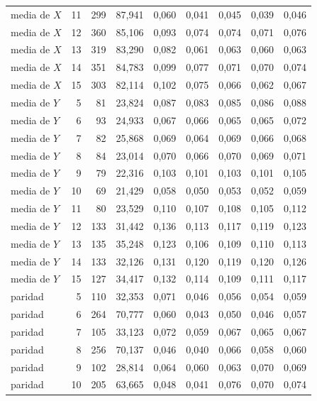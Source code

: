 \begin{table}[htbp]
{\begin{tabular}{@{}lrrrrrrrr@{}}
        media de $X$ & 11 & 299 & 87,941 & 0,060 & 0,041 & 0,045 & 0,039 & 0,046 \\
        media de $X$ & 12 & 360 & 85,106 & 0,093 & 0,074 & 0,074 & 0,071 & 0,076 \\
        media de $X$ & 13 & 319 & 83,290 & 0,082 & 0,061 & 0,063 & 0,060 & 0,063 \\
        media de $X$ & 14 & 351 & 84,783 & 0,099 & 0,077 & 0,071 & 0,070 & 0,074 \\
        media de $X$ & 15 & 303 & 82,114 & 0,102 & 0,075 & 0,066 & 0,062 & 0,067 \\
        media de $Y$ & 5 & 81 & 23,824 & 0,087 & 0,083 & 0,085 & 0,086 & 0,088 \\
        media de $Y$ & 6 & 93 & 24,933 & 0,067 & 0,066 & 0,065 & 0,065 & 0,072 \\
        media de $Y$ & 7 & 82 & 25,868 & 0,069 & 0,064 & 0,069 & 0,066 & 0,068 \\
        media de $Y$ & 8 & 84 & 23,014 & 0,070 & 0,066 & 0,070 & 0,069 & 0,071 \\
        media de $Y$ & 9 & 79 & 22,316 & 0,103 & 0,101 & 0,103 & 0,101 & 0,105 \\
        media de $Y$ & 10 & 69 & 21,429 & 0,058 & 0,050 & 0,053 & 0,052 & 0,059 \\
        media de $Y$ & 11 & 80 & 23,529 & 0,110 & 0,107 & 0,108 & 0,105 & 0,112 \\
        media de $Y$ & 12 & 133 & 31,442 & 0,136 & 0,113 & 0,117 & 0,119 & 0,123 \\
        media de $Y$ & 13 & 135 & 35,248 & 0,123 & 0,106 & 0,109 & 0,110 & 0,113 \\
        media de $Y$ & 14 & 133 & 32,126 & 0,131 & 0,120 & 0,119 & 0,120 & 0,126 \\
        media de $Y$ & 15 & 127 & 34,417 & 0,132 & 0,114 & 0,109 & 0,111 & 0,117 \\
        paridad & 5 & 110 & 32,353 & 0,071 & 0,046 & 0,056 & 0,054 & 0,059 \\
        paridad & 6 & 264 & 70,777 & 0,060 & 0,043 & 0,050 & 0,046 & 0,057 \\
        paridad & 7 & 105 & 33,123 & 0,072 & 0,059 & 0,067 & 0,065 & 0,067 \\
        paridad & 8 & 256 & 70,137 & 0,046 & 0,040 & 0,066 & 0,058 & 0,060 \\
        paridad & 9 & 102 & 28,814 & 0,064 & 0,060 & 0,063 & 0,070 & 0,069 \\
        paridad & 10 & 205 & 63,665 & 0,048 & 0,041 & 0,076 & 0,070 & 0,074 \\

\end{tabular}}
\end{table}
